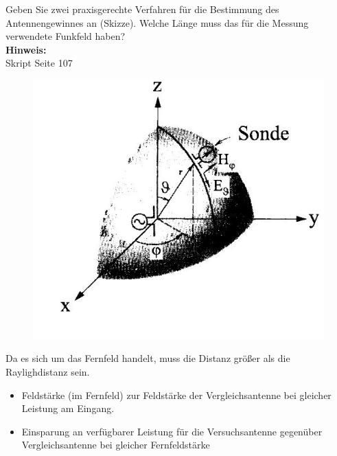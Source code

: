 \begin{question}[section=11,name={Antennengewinn 2},difficulty=,quantity=2,type=thr,tags={20130625}]
	Geben Sie zwei praxisgerechte Verfahren für die Bestimmung des Antennengewinnes an (Skizze). Welche Länge muss das für die Messung verwendete Funkfeld haben?
	\\ \textbf{Hinweis:}\\
	Skript Seite 107
\end{question}
\begin{solution}
	\begin{figure}[H]
		\includegraphics[width=14cm]{./opn/exm/thr/chp/11/2/bild.jpeg}
	\end{figure}
	Da es sich um das Fernfeld handelt, muss die Distanz größer als die Raylighdistanz sein.\\
	\begin{itemize}
		\item{Feldstärke (im Fernfeld) zur Feldstärke der Vergleichsantenne bei gleicher Leistung am Eingang.}
		\item{Einsparung an verfügbarer Leistung für die Versuchsantenne gegenüber Vergleichsantenne bei gleicher Fernfeldstärke}
	\end{itemize}
\end{solution}